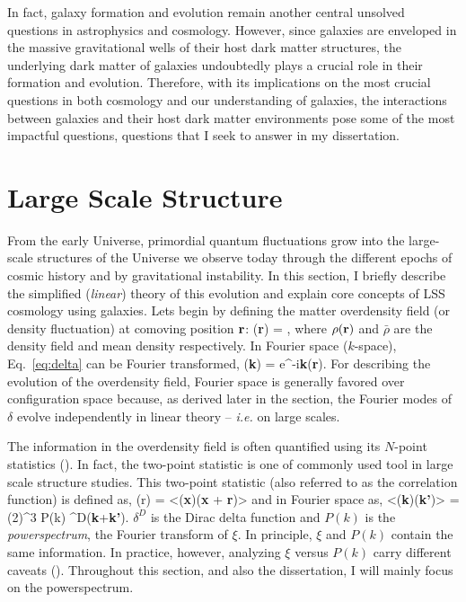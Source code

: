 In fact, galaxy formation and evolution remain another central unsolved questions in
astrophysics and cosmology. However, since galaxies are enveloped in the massive gravitational
wells of their host dark matter structures, the underlying dark matter of galaxies undoubtedly
plays a crucial role in their formation and evolution. Therefore, with its implications on the most
crucial questions in both cosmology and our understanding of galaxies, the interactions between
galaxies and their host dark matter environments pose some of the most impactful questions,
questions that I seek to answer in my dissertation. 


\section{Large Scale Structure} \label{sec:lss}
From the early Universe, primordial quantum fluctuations grow into the 
large-scale structures of the Universe we observe today through the different
epochs of cosmic history and by gravitational instability. In this section, I briefly 
describe the simplified ({\em linear}) theory of this evolution and explain core 
concepts of LSS cosmology using galaxies. Lets begin by defining the matter 
overdensity field (or density fluctuation) at comoving position ${\bf r}$: 
\beq \label{eq:delta}
\delta({\bf r}) = , 
\eeq
where $\rho({\bf r})$ and $\bar{\rho}$ are the density field and mean 
density respectively. In Fourier space ($k$-space), Eq.~\ref{eq:delta} can 
be Fourier transformed, 
\beq
\delta({\bf k}) = \int {} e^{-i{\bf k}}\;\delta({\bf r}).
\eeq
For describing the evolution of the overdensity field, Fourier space is generally 
favored over configuration space because, as derived later in the section,
the Fourier modes of $\delta$ evolve independently in linear theory -- 
\emph{i.e.} on large scales.

The information in the overdensity field is often quantified using its 
$N$-point statistics (). In fact, the two-point
statistic is one of commonly used tool in large scale structure studies.
This two-point statistic (also referred to as the correlation function) is
defined as, 
\beq
\xi(r) = <\delta({\bf x})\delta({\bf x} +  {\bf r})>
\eeq
and in Fourier space as,
\beq
<\delta({\bf k})\delta({\bf k'})> = (2\pi)^3 P(k) \delta^{D}({\bf k}+{\bf k'}).
\eeq
$\delta^{D}$ is the Dirac delta function and $P(k)$ is the {\em powerspectrum}, 
the Fourier transform of $\xi$. In principle, $\xi$ and $P(k)$ contain the same 
information. In practice, however, analyzing $\xi$ versus $P(k)$ carry different 
caveats (). Throughout this section, and also the dissertation, 
I will mainly focus on the powerspectrum. 

